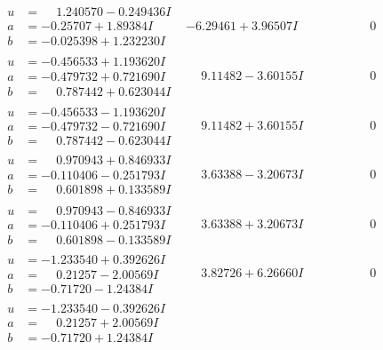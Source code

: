 \documentclass[1p]{elsarticle_modified}
\theoremstyle{definition}
\begin{document}
$$\begin{array}{c|c|c}
\begin{aligned}
u &= \phantom{-}1.240570 - 0.249436 I \\
a &= -0.25707 + 1.89384 I \\
b &= -0.025398 + 1.232230 I\end{aligned}
 & -6.29461 + 3.96507 I & \phantom{-0.000000 } 0 \\ \hline\begin{aligned}
u &= -0.456533 + 1.193620 I \\
a &= -0.479732 + 0.721690 I \\
b &= \phantom{-}0.787442 + 0.623044 I\end{aligned}
 & \phantom{-}9.11482 - 3.60155 I & \phantom{-0.000000 } 0 \\ \hline\begin{aligned}
u &= -0.456533 - 1.193620 I \\
a &= -0.479732 - 0.721690 I \\
b &= \phantom{-}0.787442 - 0.623044 I\end{aligned}
 & \phantom{-}9.11482 + 3.60155 I & \phantom{-0.000000 } 0 \\ \hline\begin{aligned}
u &= \phantom{-}0.970943 + 0.846933 I \\
a &= -0.110406 - 0.251793 I \\
b &= \phantom{-}0.601898 + 0.133589 I\end{aligned}
 & \phantom{-}3.63388 - 3.20673 I & \phantom{-0.000000 } 0 \\ \hline\begin{aligned}
u &= \phantom{-}0.970943 - 0.846933 I \\
a &= -0.110406 + 0.251793 I \\
b &= \phantom{-}0.601898 - 0.133589 I\end{aligned}
 & \phantom{-}3.63388 + 3.20673 I & \phantom{-0.000000 } 0 \\ \hline\begin{aligned}
u &= -1.233540 + 0.392626 I \\
a &= \phantom{-}0.21257 - 2.00569 I \\
b &= -0.71720 - 1.24384 I\end{aligned}
 & \phantom{-}3.82726 + 6.26660 I & \phantom{-0.000000 } 0 \\ \hline\begin{aligned}
u &= -1.233540 - 0.392626 I \\
a &= \phantom{-}0.21257 + 2.00569 I \\
b &= -0.71720 + 1.24384 I\end{aligned}

\end{array}$$
\end{document}
